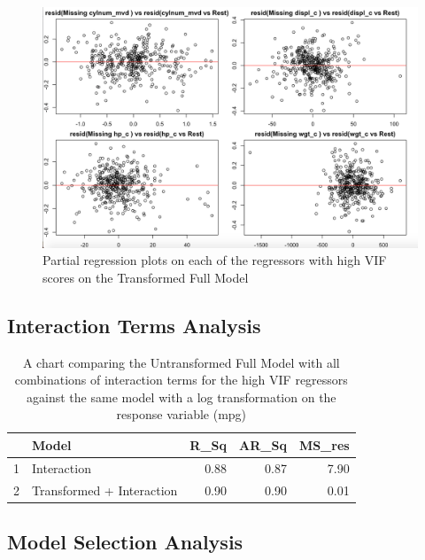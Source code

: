 \documentclass{article}
\begin{document}
\begin{figure}
	\centering
	\includegraphics[width=1\linewidth]{24-27t_PrRgall4}
	\caption[Partial regression plots on high VIF regressors on the Transformed Full Model]
	{Partial regression plots on each of the regressors with high VIF scores on the Transformed Full Model}
\end{figure}

\clearpage
\newpage

\subsection{Interaction Terms Analysis}

\begin{table}[ht]
\centering
\begin{tabular}{rlrrr}
  \hline
 & Model & R\_Sq & AR\_Sq & MS\_res \\ 
  \hline
1 & Interaction & 0.88 & 0.87 & 7.90 \\ 
  2 & Transformed + Interaction & 0.90 & 0.90 & 0.01 \\ 
   \hline
\end{tabular}
\caption{A chart comparing the Untransformed Full Model with all combinations of interaction terms for the high VIF regressors against the same model with a log transformation on the response variable (mpg)}
\label{tab:myfirsttable}
\end{table}

\newpage

\subsection{Model Selection Analysis}
\end{document}
